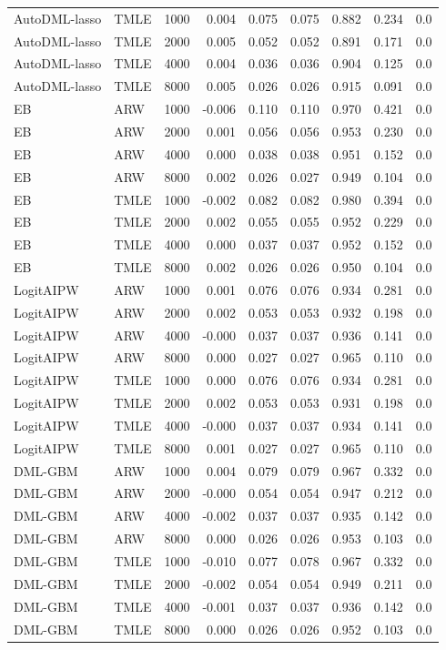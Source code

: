 \begin{tabular}{llrrrrrrr}
AutoDML-lasso & TMLE & 1000 & 0.004 & 0.075 & 0.075 & 0.882 & 0.234 & 0.0 \\
AutoDML-lasso & TMLE & 2000 & 0.005 & 0.052 & 0.052 & 0.891 & 0.171 & 0.0 \\
AutoDML-lasso & TMLE & 4000 & 0.004 & 0.036 & 0.036 & 0.904 & 0.125 & 0.0 \\
AutoDML-lasso & TMLE & 8000 & 0.005 & 0.026 & 0.026 & 0.915 & 0.091 & 0.0 \\
EB & ARW & 1000 & -0.006 & 0.110 & 0.110 & 0.970 & 0.421 & 0.0 \\
EB & ARW & 2000 & 0.001 & 0.056 & 0.056 & 0.953 & 0.230 & 0.0 \\
EB & ARW & 4000 & 0.000 & 0.038 & 0.038 & 0.951 & 0.152 & 0.0 \\
EB & ARW & 8000 & 0.002 & 0.026 & 0.027 & 0.949 & 0.104 & 0.0 \\
EB & TMLE & 1000 & -0.002 & 0.082 & 0.082 & 0.980 & 0.394 & 0.0 \\
EB & TMLE & 2000 & 0.002 & 0.055 & 0.055 & 0.952 & 0.229 & 0.0 \\
EB & TMLE & 4000 & 0.000 & 0.037 & 0.037 & 0.952 & 0.152 & 0.0 \\
EB & TMLE & 8000 & 0.002 & 0.026 & 0.026 & 0.950 & 0.104 & 0.0 \\
LogitAIPW & ARW & 1000 & 0.001 & 0.076 & 0.076 & 0.934 & 0.281 & 0.0 \\
LogitAIPW & ARW & 2000 & 0.002 & 0.053 & 0.053 & 0.932 & 0.198 & 0.0 \\
LogitAIPW & ARW & 4000 & -0.000 & 0.037 & 0.037 & 0.936 & 0.141 & 0.0 \\
LogitAIPW & ARW & 8000 & 0.000 & 0.027 & 0.027 & 0.965 & 0.110 & 0.0 \\
LogitAIPW & TMLE & 1000 & 0.000 & 0.076 & 0.076 & 0.934 & 0.281 & 0.0 \\
LogitAIPW & TMLE & 2000 & 0.002 & 0.053 & 0.053 & 0.931 & 0.198 & 0.0 \\
LogitAIPW & TMLE & 4000 & -0.000 & 0.037 & 0.037 & 0.934 & 0.141 & 0.0 \\
LogitAIPW & TMLE & 8000 & 0.001 & 0.027 & 0.027 & 0.965 & 0.110 & 0.0 \\
DML-GBM & ARW & 1000 & 0.004 & 0.079 & 0.079 & 0.967 & 0.332 & 0.0 \\
DML-GBM & ARW & 2000 & -0.000 & 0.054 & 0.054 & 0.947 & 0.212 & 0.0 \\
DML-GBM & ARW & 4000 & -0.002 & 0.037 & 0.037 & 0.935 & 0.142 & 0.0 \\
DML-GBM & ARW & 8000 & 0.000 & 0.026 & 0.026 & 0.953 & 0.103 & 0.0 \\
DML-GBM & TMLE & 1000 & -0.010 & 0.077 & 0.078 & 0.967 & 0.332 & 0.0 \\
DML-GBM & TMLE & 2000 & -0.002 & 0.054 & 0.054 & 0.949 & 0.211 & 0.0 \\
DML-GBM & TMLE & 4000 & -0.001 & 0.037 & 0.037 & 0.936 & 0.142 & 0.0 \\
DML-GBM & TMLE & 8000 & 0.000 & 0.026 & 0.026 & 0.952 & 0.103 & 0.0 \\
\hline
\end{tabular}
